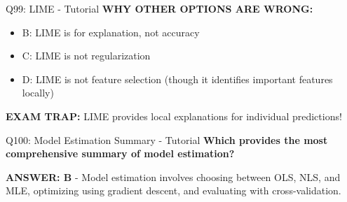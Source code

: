 \documentclass[8pt]{beamer}
\begin{document}
\begin{frame}{Q99: LIME - Tutorial}
		\vspace{0.05cm}
		\textcolor{myred}{\textbf{WHY OTHER OPTIONS ARE WRONG:}}
		\begin{itemize}
			\item \textcolor{myred}{B:} LIME is for explanation, not accuracy
			\item \textcolor{myred}{C:} LIME is not regularization
			\item \textcolor{myred}{D:} LIME is not feature selection (though it identifies important features locally)
		\end{itemize}
		
		\textcolor{myred}{\textbf{EXAM TRAP:}} LIME provides local explanations for individual predictions!
	\end{frame}
	
	\begin{frame}{Q100: Model Estimation Summary - Tutorial}
		\fontsize{6.5}{7.5}\selectfont
		\textbf{Which provides the most comprehensive summary of model estimation?}
		
		\vspace{0.05cm}
		\textcolor{myblue}{\textbf{ANSWER: B}} - Model estimation involves choosing between OLS, NLS, and MLE, optimizing using gradient descent, and evaluating with cross-validation.
		

\end{frame}
\end{document}
